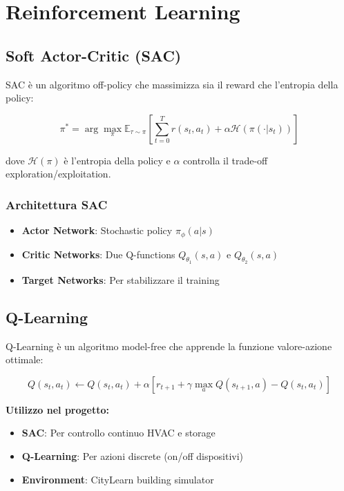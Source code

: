 \documentclass[12pt,a4paper,twoside]{report}
\begin{document}
\section{Reinforcement Learning}

\subsection{Soft Actor-Critic (SAC)}

SAC è un algoritmo off-policy che massimizza sia il reward che l'entropia della policy:

\begin{equation}
\pi^* = \arg\max_{\pi} \mathbb{E}_{\tau \sim \pi} \left[ \sum_{t=0}^{T} r(s_t, a_t) + \alpha \mathcal{H}(\pi(\cdot|s_t)) \right]
\end{equation}

dove $\mathcal{H}(\pi)$ è l'entropia della policy e $\alpha$ controlla il trade-off exploration/exploitation.

\subsubsection{Architettura SAC}
\begin{itemize}
    \item \textbf{Actor Network}: Stochastic policy $\pi_\phi(a|s)$
    \item \textbf{Critic Networks}: Due Q-functions $Q_{\theta_1}(s,a)$ e $Q_{\theta_2}(s,a)$
    \item \textbf{Target Networks}: Per stabilizzare il training
\end{itemize}

\subsection{Q-Learning}

Q-Learning è un algoritmo model-free che apprende la funzione valore-azione ottimale:

\begin{equation}
Q(s_t, a_t) \leftarrow Q(s_t, a_t) + \alpha \left[ r_{t+1} + \gamma \max_a Q(s_{t+1}, a) - Q(s_t, a_t) \right]
\end{equation}

\textbf{Utilizzo nel progetto:}
\begin{itemize}
    \item \textbf{SAC}: Per controllo continuo HVAC e storage
    \item \textbf{Q-Learning}: Per azioni discrete (on/off dispositivi)
    \item \textbf{Environment}: CityLearn building simulator
\end{itemize}
\end{document}
